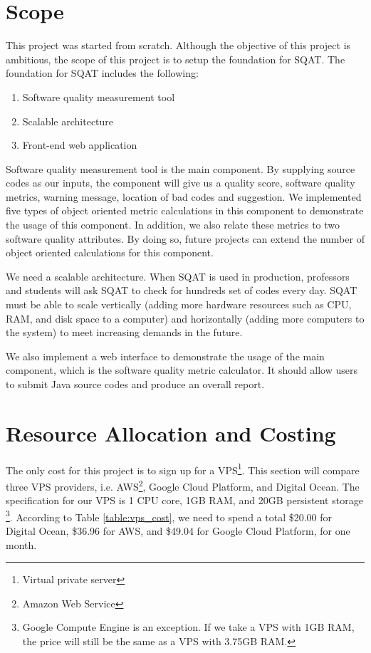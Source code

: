 \section{Scope}

This project was started from scratch. Although the objective of this project is ambitious, the scope of this project is to setup the foundation for SQAT. The foundation for SQAT includes the following:

\begin{enumerate}
    \item Software quality measurement tool
    \item Scalable architecture
    \item Front-end web application
\end{enumerate}

Software quality measurement tool is the main component. By supplying source codes as our inputs, the component will give us a quality score, software quality metrics, warning message, location of bad codes and suggestion. We implemented five types of object oriented metric calculations in this component to demonstrate the usage of this component. In addition, we also relate these metrics to two software quality attributes. By doing so, future projects can extend the number of object oriented calculations for this component. 

We need a scalable architecture. When SQAT is used in production, professors and students will ask SQAT to check for hundreds set of codes every day. SQAT must be able to scale vertically (adding more hardware resources such as CPU, RAM, and disk space to a computer) and horizontally (adding more computers to the system) to meet increasing demands in the future.

We also implement a web interface to demonstrate the usage of the main component, which is the software quality metric calculator. It should allow users to submit Java source codes and produce an overall report. 

\section{Resource Allocation and Costing}

The only cost for this project is to sign up for a VPS\footnote{Virtual private server}. This section will compare three VPS providers, i.e. AWS\footnote{Amazon Web Service}, Google Cloud Platform, and Digital Ocean. The specification for our VPS is 1 CPU core, 1GB RAM, and 20GB persistent storage \footnote{Google Compute Engine is an exception. If we take a VPS with 1GB RAM, the price will still be the same as a VPS with 3.75GB RAM. }. According to Table \ref{table:vps_cost}, we need to spend a total \$20.00 for Digital Ocean, \$36.96 for AWS, and \$49.04 for Google Cloud Platform, for one month. 

